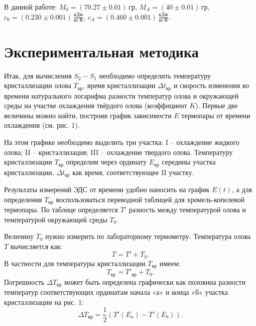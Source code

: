 \documentclass[a4paper]{article}
\begin{document}
В данной работе:
$M_0=(70.27\pm 0.01)\,\text{гр}$, \qquad $M_A=(40\pm 0.01)\,\text{гр}$,
$c_0=(0.230 \pm 0.001)\,\frac{\text{кДж}}{\text{кг}\cdot\text{К}}$, \qquad $c_A=(0.460 \pm 0.001)\,\frac{\text{кДж}}{\text{кг}\cdot\text{К}}$.

\section*{Экспериментальная методика}

Итак, для вычисления $S_2 - S_1$ необходимо определить температуру кристаллизации олова $T_{\text{кр}}$, время кристаллизации $\Delta t_{\text{кр}}$ и скорость изменения во времени натурального логарифма разности температур олова и окружающей среды на участке охлаждения твёрдого олова (коэффициент $K$). Первые две величины можно найти, построив график зависимости $E$ термопары от времени охлаждения (см. рис. 1).

На этом графике необходимо выделить три участка: I – охлаждение жидкого олова; II – кристаллизация; III – охлаждение твердого олова. Температуру кристаллизации $T_{\text{кр}}$ определим через ординату $E_{\text{кр}}$ середины участка кристаллизации, $\Delta t_{\text{кр}}$ как время, соответствующее II участку.

Результаты измерений ЭДС от времени удобно наносить на график $E(t)$, а для определения $T_{\text{кр}}$ воспользоваться переводной таблицей для хромель-копелевой термопары. По таблице определяется $T'$ разность между температурой олова и температурой окружающей среды $T_0$.

Величину $T_0$ нужно измерить по лабораторному термометру. Температура олова $T$ вычисляется как:
\begin{equation} \label{eq:13}
T = T' + T_0.
\end{equation}
В частности для температуры кристаллизации $T_{\text{кр}}$ имеем:
\begin{equation} \label{eq:14}
T_{\text{кр}} = T'_{\text{кр}} + T_0.
\end{equation}
Погрешность $\Delta T_{\text{кр}}$ может быть определена графически как половина разности температур соответствующих ординатам начала «а» и конца «б» участка кристаллизации на рис. 1:
\begin{equation}
\Delta T_{\text{кр}} = \frac{1}{2} (T'(E_a) - T'(E_b)).
\end{equation}
\end{document}
